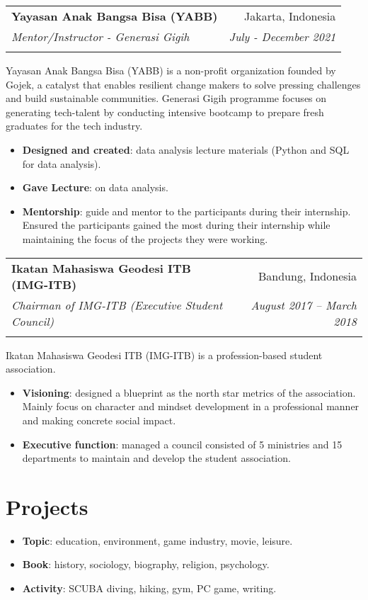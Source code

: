 \documentclass[a4paper, 11pt]{article}
\makeatletter
\newcommand{\resumeItem}[2]{
    \item\small{
        \textbf{#1}{: #2 \vspace{-2pt}}
    }
}
\newcommand{\resumeSubheading}[4]{
    \vspace{-1pt}
    \begin{tabular*}{0.97\textwidth}{l@{\extracolsep{\fill}}r}
        \color{lightblue}\textbf{#1} & #2 \\
        \textit{\small#3} & \textit{\small #4} \\
        \textnormal{}\vspace{-5pt}
    \end{tabular*}\vspace{-5pt}
}
\newcommand{\resumeItemListStart}{\begin{itemize}[leftmargin=*]\setlength\itemsep{0em}\vspace{-1pt}}
\newcommand{\resumeItemListEnd}{\end{itemize}\vspace{-5pt}}
\makeatother
\begin{document}
    \resumeSubheading
    {Yayasan Anak Bangsa Bisa (YABB)}
    {Jakarta, Indonesia}
    {Mentor/Instructor - Generasi Gigih}
    {July - December 2021}
    {Yayasan Anak Bangsa Bisa (YABB) is a non-profit organization founded by Gojek, a catalyst that enables resilient change makers to
    solve pressing challenges and build sustainable communities. Generasi Gigih programme focuses on generating tech-talent by
    conducting intensive bootcamp to prepare fresh graduates for the tech industry.}
    \vspace{-5pt}
    \resumeItemListStart
    \resumeItem{Designed and created}{data analysis lecture materials (Python and SQL for data analysis).}
    \resumeItem{Gave Lecture}{on data analysis.}
    \resumeItem{Mentorship}{guide and mentor to the participants during their internship. Ensured the participants gained the most during their
    internship while maintaining the focus of the projects they were working.}
    \resumeItemListEnd

    \vspace{5pt}
    \resumeSubheading
    {Ikatan Mahasiswa Geodesi ITB (IMG-ITB)}
    {Bandung, Indonesia}
    {Chairman of IMG-ITB (Executive Student Council)}
    {August 2017 – March 2018}
    {Ikatan Mahasiswa Geodesi ITB (IMG-ITB) is a profession-based student association.}
    \vspace{-5pt}
    \resumeItemListStart
    \resumeItem{Visioning}{designed a blueprint as the north star metrics of the association. Mainly focus on character and mindset development in a
    professional manner and making concrete social impact.}
    \resumeItem{Executive function}{managed a council consisted of 5 ministries and 15 departments to maintain and develop the student association.}
    \resumeItemListEnd

    \vspace{-5pt}
    \section{Projects}

    \resumeItemListStart
    \resumeItem{Topic}{education, environment, game industry, movie, leisure.}
    \resumeItem{Book}{history, sociology, biography, religion, psychology.}
    \resumeItem{Activity}{SCUBA diving, hiking, gym, PC game, writing.}
    \resumeItemListEnd
\end{document}
